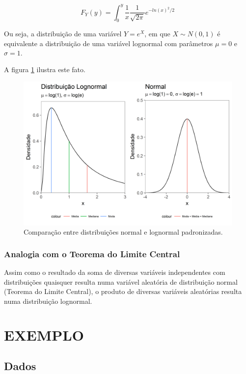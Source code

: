 \documentclass[a4paper]{article}
\begin{document}
\[F_Y(y) = \int_{0}^{y}\frac{1}{x}\frac{1}{\sqrt{2\pi}}e^{-ln(x)^2/2}\]

Ou seja, a distribuição de uma variável \(Y = e^X\), em que
\(X \sim N(0,1)\) é equivalente a distribuição de uma variável lognormal
com parâmetros \(\mu = 0\) e \(\sigma = 1\).

A figura \ref{fig:normal_lognormal} ilustra este fato.

\begin{figure}[H]

{\centering \includegraphics[width=1\linewidth]{images/normal_lognormal-1} 

}

\caption{Comparação entre distribuições normal e lognormal padronizadas.}\label{fig:normal_lognormal}
\end{figure}

\subsubsection{Analogia com o Teorema do Limite
Central}\label{analogia-com-o-teorema-do-limite-central}

Assim como o resultado da soma de diversas variáveis independentes com
distribuições quaisquer resulta numa variável aleatória de distribuição
normal (Teorema do Limite Central), o produto de diversas variáveis
aleatórias resulta numa distribuição lognormal.

\section{EXEMPLO}\label{exemplo}

\subsection{Dados}\label{dados}
\end{document}
